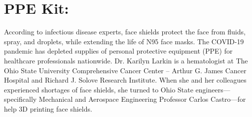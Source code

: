 \documentclass[a4paper,12pt]{article}
\begin{document}
\section{PPE Kit:}
According to infectious disease experts, face shields protect the face from
fluids, spray, and droplets, while extending the life of N95 face masks.
The COVID-19 pandemic has depleted supplies of personal protective equipment (PPE) for healthcare professionals nationwide. Dr. Karilyn Larkin is a
hematologist at The Ohio State University Comprehensive Cancer Center –
Arthur G. James Cancer Hospital and Richard J. Solove Research Institute.
When she and her colleagues experienced shortages of face shields, she turned
to Ohio State engineers—specifically Mechanical and Aerospace Engineering
Professor Carlos Castro—for help 3D printing face shields.
	
\end{document}
